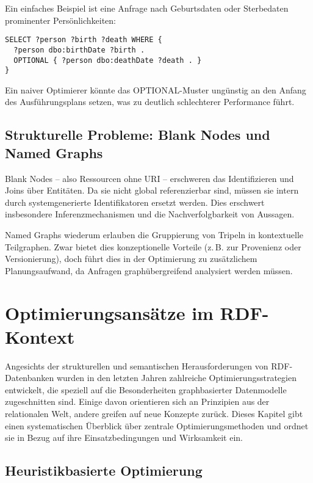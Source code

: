 \documentclass[12pt]{article}
\begin{document}
Ein einfaches Beispiel ist eine Anfrage nach Geburtsdaten oder Sterbedaten prominenter Persönlichkeiten:

\begin{lstlisting}[caption=Beispiel: OPTIONAL-Abfrage in SPARQL]
SELECT ?person ?birth ?death WHERE {
  ?person dbo:birthDate ?birth .
  OPTIONAL { ?person dbo:deathDate ?death . }
}
\end{lstlisting}

Ein naiver Optimierer könnte das OPTIONAL-Muster ungünstig an den Anfang des Ausführungsplans setzen, was zu deutlich schlechterer Performance führt.

\subsection{Strukturelle Probleme: Blank Nodes und Named Graphs}

Blank Nodes – also Ressourcen ohne URI – erschweren das Identifizieren und Joins über Entitäten. Da sie nicht global referenzierbar sind, müssen sie intern durch systemgenerierte Identifikatoren ersetzt werden. Dies erschwert insbesondere Inferenzmechanismen und die Nachverfolgbarkeit von Aussagen.

Named Graphs wiederum erlauben die Gruppierung von Tripeln in kontextuelle Teilgraphen. Zwar bietet dies konzeptionelle Vorteile (z.\,B. zur Provenienz oder Versionierung), doch führt dies in der Optimierung zu zusätzlichem Planungsaufwand, da Anfragen graphübergreifend analysiert werden müssen.

\section{Optimierungsansätze im RDF-Kontext} \label{sec:ansaetze}

Angesichts der strukturellen und semantischen Herausforderungen von RDF-Datenbanken wurden in den letzten Jahren zahlreiche Optimierungsstrategien entwickelt, die speziell auf die Besonderheiten graphbasierter Datenmodelle zugeschnitten sind. Einige davon orientieren sich an Prinzipien aus der relationalen Welt, andere greifen auf neue Konzepte zurück. Dieses Kapitel gibt einen systematischen Überblick über zentrale Optimierungsmethoden und ordnet sie in Bezug auf ihre Einsatzbedingungen und Wirksamkeit ein.

\subsection{Heuristikbasierte Optimierung}
\end{document}
